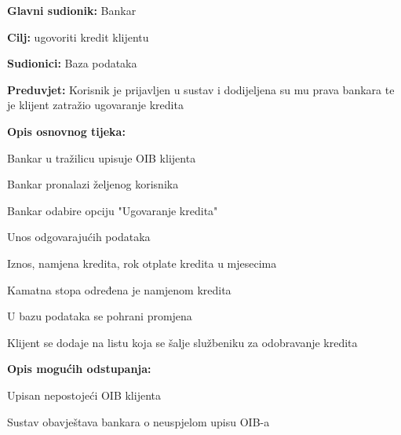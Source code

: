                 
                
                 \noindent {}
                \begin{packed_item}
                	
                	\item \textbf{Glavni sudionik: }Bankar
                	\item  \textbf{Cilj:} ugovoriti kredit klijentu
                	\item  \textbf{Sudionici:} Baza podataka
                	\item  \textbf{Preduvjet:} Korisnik je prijavljen u sustav i dodijeljena su mu prava bankara te je klijent zatražio ugovaranje kredita
                	\item  \textbf{Opis osnovnog tijeka:}
                	
                	\item[] \begin{packed_enum}
                		
                		\item Bankar u tražilicu upisuje OIB klijenta
                		\item Bankar pronalazi željenog korisnika
                		\item Bankar odabire opciju "Ugovaranje kredita"
                		\item Unos odgovarajućih podataka
                		\begin{packed_enum}
                			\item Iznos, namjena kredita, rok otplate kredita u mjesecima
                			\item Kamatna stopa određena je namjenom kredita
                		\end{packed_enum}
                		\item U bazu podataka se pohrani promjena 
                		\item Klijent se dodaje na listu koja se šalje službeniku za odobravanje kredita
                	\end{packed_enum}
                	
                	\item  \textbf{Opis mogućih odstupanja:} 
                	
                	\item[] \begin{packed_item}
                		
                		\item[1.a] Upisan nepostojeći OIB klijenta
                		\item[] \begin{packed_enum}
                			
                			\item Sustav obavještava bankara o neuspjelom upisu OIB-a
                			
                		\end{packed_enum}
                		
                	\end{packed_item}
                \end{packed_item}
